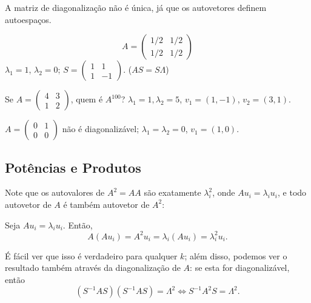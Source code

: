 A matriz de diagonalização não é única, já que os autovetores definem autoespaços.

\begin{exemplo*}
   $$A =
   \begin{pmatrix}
      1/2 & 1/2\\
      1/2 & 1/2
   \end{pmatrix}$$
   $\lambda_1=1$, $\lambda_2=0$; $S =
   \begin{pmatrix}
      1 & 1\\
      1 & -1
   \end{pmatrix}$. ($AS=S\Lambda$)
\end{exemplo*}

\begin{exemplo*}
   Se $A=
   \begin{pmatrix}
      4 & 3\\
      1 & 2
   \end{pmatrix}$, 
   quem é $A^{100}$? $\lambda_1=1, \lambda_2=5$, $v_1=(1,-1)$, $v_2=(3,1)$.
\end{exemplo*}

\begin{exemplo*}
   $A=
   \begin{pmatrix}
      0 & 1\\
      0 & 0
   \end{pmatrix}$
   não é diagonalizável; $\lambda_1=\lambda_2=0$, $v_1=(1,0)$.
\end{exemplo*}

\subsection{Potências e Produtos}

Note que os autovalores de $A^2= AA$ são exatamente $\lambda_i^2$, onde $Au_i=\lambda_i u_i$, e todo autovetor de $A$ é também autovetor de $A^2$: 

Seja $Au_i=\lambda_i u_i$. Então, 
\begin{equation*}
   A(Au_i) = A^2u_i = \lambda_i (Au_i) = \lambda_i^2 u_i.
\end{equation*}

É fácil ver que isso é verdadeiro para qualquer $k$; além disso, podemos ver o resultado também através da diagonalização de $A$: se esta for diagonalizável, então
\begin{equation*}
  (S^{-1}AS)(S^{-1}AS) = \Lambda^2 \Leftrightarrow S^{-1}A^2S = \Lambda^2.
\end{equation*}

